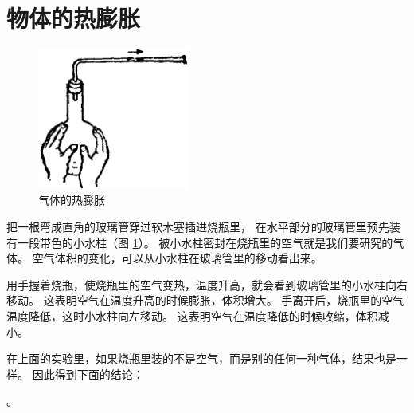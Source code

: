 \section{物体的热膨胀}\label{sec:2-1}

\begin{figure}
    \centering
    \includegraphics[width=5cm]{../pic/czwl2-ch2-1}
    \caption{气体的热膨胀}\label{fig:2-1}
\end{figure}

把一根弯成直角的玻璃管穿过软木塞插进烧瓶里，
在水平部分的玻璃管里预先装有一段带色的小水柱（图 \ref{fig:2-1}）。
被小水柱密封在烧瓶里的空气就是我们要研究的气体。
空气体积的变化，可以从小水柱在玻璃管里的移动看出来。

用手握着烧瓶，使烧瓶里的空气变热，温度升高，就会看到玻璃管里的小水柱向右移动。
这表明空气在温度升高的时候膨胀，体积增大。
手离开后，烧瓶里的空气温度降低，这时小水柱向左移动。
这表明空气在温度降低的时候收缩，体积减小。

在上面的实验里，如果烧瓶里装的不是空气，而是别的任何一种气体，结果也是一样。
因此得到下面的结论：

。


